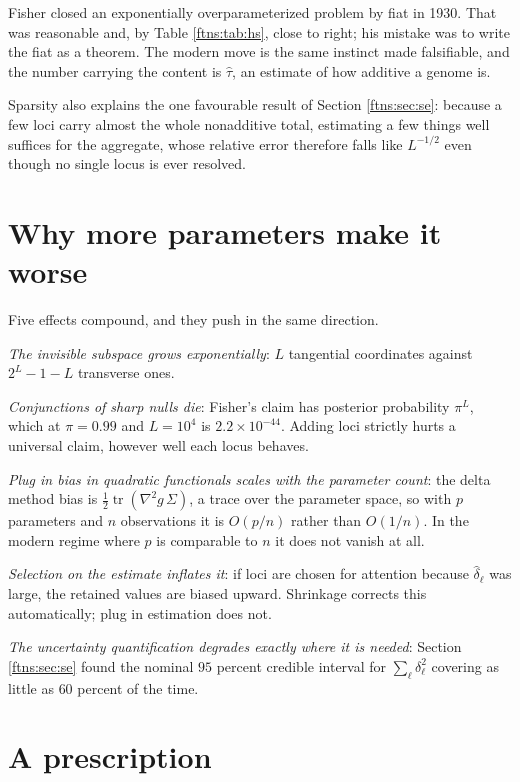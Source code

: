 Fisher closed an exponentially overparameterized problem by fiat in 1930. That was reasonable
and, by Table \ref{ftns:tab:hs}, close to right; his mistake was to write the fiat as a theorem. The
modern move is the same instinct made falsifiable, and the number carrying the content is
$\hat\tau$, an estimate of how additive a genome is.

Sparsity also explains the one favourable result of Section \ref{ftns:sec:se}: because a few loci carry
almost the whole nonadditive total, estimating a few things well suffices for the aggregate, whose
relative error therefore falls like $L^{-1/2}$ even though no single locus is ever resolved.

\section{Why more parameters make it worse}
\label{ftns:sec:worse}

Five effects compound, and they push in the same direction.

\emph{The invisible subspace grows exponentially}: $L$ tangential coordinates against $2^L-1-L$
transverse ones.

\emph{Conjunctions of sharp nulls die}: Fisher's claim has posterior probability $\pi^L$, which at
$\pi=0.99$ and $L=10^4$ is $2.2\times10^{-44}$. Adding loci strictly hurts a universal claim,
however well each locus behaves.

\emph{Plug in bias in quadratic functionals scales with the parameter count}: the delta method bias
is $\tfrac12\operatorname{tr}(\nabla^2g\,\Sigma)$, a trace over the parameter space, so with $p$
parameters and $n$ observations it is $O(p/n)$ rather than $O(1/n)$. In the modern regime where $p$
is comparable to $n$ it does not vanish at all.

\emph{Selection on the estimate inflates it}: if loci are chosen for attention because
$\hat\delta_\ell$ was large, the retained values are biased upward. Shrinkage corrects this
automatically; plug in estimation does not.

\emph{The uncertainty quantification degrades exactly where it is needed}: Section \ref{ftns:sec:se}
found the nominal $95$ percent credible interval for $\sum_\ell\delta^2_\ell$ covering as little as
$60$ percent of the time.

\section{A prescription}
\label{ftns:sec:prescription}

